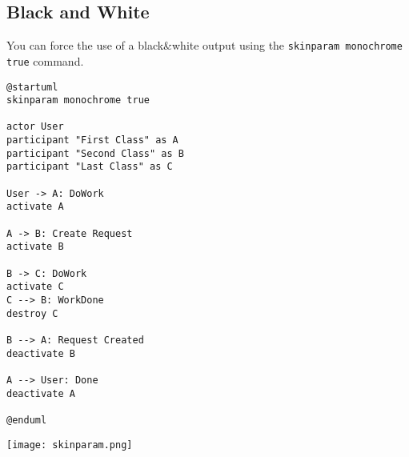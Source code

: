 \newpage \subsection{Black and White} 

You can force the use of a black&white output using the
\texttt{skinparam monochrome true} command.
 
\begin{lstlisting}
@startuml
skinparam monochrome true

actor User
participant "First Class" as A
participant "Second Class" as B
participant "Last Class" as C

User -> A: DoWork
activate A

A -> B: Create Request
activate B

B -> C: DoWork
activate C
C --> B: WorkDone
destroy C

B --> A: Request Created
deactivate B

A --> User: Done
deactivate A

@enduml
\end{lstlisting}

\begin{center}
\texttt{[image: skinparam.png]}
\end{center}
 